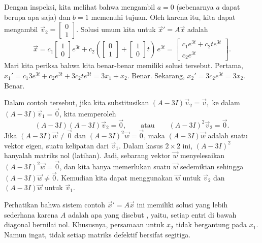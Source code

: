 \begin{example}
\begin{equation*}
\end{equation*}
Dengan inspeksi, kita melihat bahwa mengambil $a=0$ (sebenarnya $a$ dapat berupa apa saja) dan
$b=1$ memenuhi tujuan.  Oleh karena itu, kita dapat mengambil $\vec{v}_2 = 
\left[ \begin{smallmatrix} 0 \\ 1 \end{smallmatrix} \right]$.  Solusi umum
kita untuk
${\vec{x}}' = A\vec{x}$ adalah
\begin{equation*}
\vec{x} =
c_1 
\begin{bmatrix}
1 \\ 0
\end{bmatrix}
e^{3t}
+
c_2
\left(
\begin{bmatrix}
0 \\ 1
\end{bmatrix}
+
\begin{bmatrix}
1 \\ 0
\end{bmatrix}
t
\right)
\,
e^{3t}
=
\begin{bmatrix}
c_1 e^{3t}+c_2 te^{3t} \\
c_2 e^{3t}
\end{bmatrix} .
\end{equation*}
Mari kita periksa bahwa kita benar-benar memiliki solusi tersebut.  Pertama,
$x_1' = 
c_1 3 e^{3t}+c_2 e^{3t} + 3 c_2 te^{3t} = 3 x_1 + x_2$.  Benar.  Sekarang,
$x_2' = 3 c_2 e^{3t} = 3x_2$.  Benar.
\end{example}

Dalam contoh tersebut, jika kita substitusikan $(A-3I)\vec{v}_2 = \vec{v}_1$ ke dalam
$(A-3I)\vec{v}_1 = \vec{0}$, kita memperoleh
\begin{equation*}
(A-3I)(A-3I) \vec{v}_2 = \vec{0},
\qquad \text{atau} \qquad
{(A-3I)}^2\vec{v}_2 = \vec{0}.
\end{equation*}
Jika 
$(A-3I) \vec{w} \neq \vec{0}$
dan
${(A-3I)}^2 \vec{w} = \vec{0}$, maka 
$(A-3I) \vec{w}$ adalah suatu vektor eigen, suatu kelipatan dari $\vec{v}_1$.
Dalam kasus $2 \times 2$ ini, ${(A-3I)}^2$ hanyalah matriks nol (latihan).
Jadi, sebarang vektor $\vec{w}$ menyelesaikan
${(A-3I)}^2\vec{w} = \vec{0}$, dan kita hanya memerlukan suatu $\vec{w}$ sedemikian sehingga
$(A-3I)\vec{w} \neq \vec{0}$.  Kemudian kita dapat menggunakan
$\vec{w}$ untuk $\vec{v}_2$ dan $(A-3I)\vec{w}$ untuk $\vec{v}_1$.

Perhatikan bahwa sistem contoh ${\vec{x}}' = A \vec{x}$ ini memiliki solusi yang lebih sederhana karena
$A$ adalah apa yang disebut \emph{}, yaitu,
setiap entri di bawah diagonal bernilai nol.
Khususnya, persamaan untuk $x_2$
tidak bergantung pada $x_1$.  Namun ingat, tidak setiap matriks defektif bersifat
segitiga.

